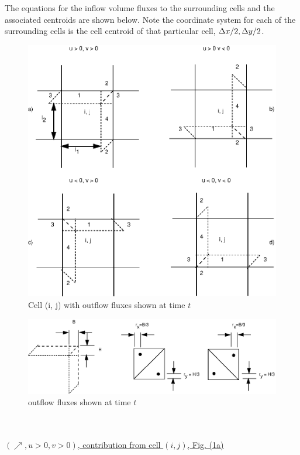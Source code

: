 \documentclass[fleqn]{article}
\begin{document}
{The equations for the inflow volume fluxes to the surrounding cells and
the associated centroids are shown below. Note the coordinate system for
each of the surrounding cells is the cell centroid of that particular cell,
$\delx/2, \dely/2$.
%
%
\begin{figure}
    \center
    \includegraphics{advect_flux_vol_1.eps}
    \caption{Cell (i, j) with outflow fluxes shown at time $t$}
    \label{Fig:flux_vol_1}
\end{figure}
%
%
\begin{figure}
    \center
    \includegraphics{advect_flux_vol_2.eps}
    \caption{outflow fluxes shown at time $t$}
    \label{Fig:flux_vol_2}
\end{figure}
%
%
\\
\\
\underline{$(\nearrow, u > 0, v > 0)$, contribution from cell $(i, j)$, Fig. (\ref{Fig:flux_vol_1}a)}
\\
}
\end{document}
